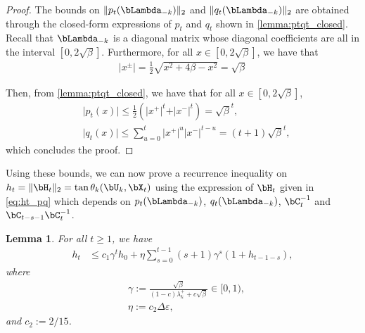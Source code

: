 \documentclass{article}
\theoremstyle{plain}
\newtheorem{lemma}[theorem]{Lemma}
\theoremstyle{definition}
\theoremstyle{remark}
\begin{document}
\begin{proof}
  The bounds on $\Vert p_t(\bLambda_{-k})\Vert_2$ and $\Vert q_t(\bLambda_{-k})\Vert_2$ are obtained through the closed-form expressions of $p_t$ and $q_t$ shown in \cref{lemma:ptqt_closed}. Recall that $\bLambda_{-k}$ is a diagonal matrix whose diagonal coefficients are all in the interval $[0, 2\sqrt{\beta}]$. Furthermore, for all $x\in [0,2\sqrt{\beta}]$, we have that
  \begin{align*}
    \vert x^\pm \vert = \frac{1}{2}\sqrt{x^2 + 4\beta - x^2} = \sqrt{\beta}
  \end{align*}
  
  Then, from \cref{lemma:ptqt_closed}, we have that for all $x \in [0,2\sqrt{\beta}]$,
  \begin{align*}
    & \vert p_t(x) \vert \leqslant \frac{1}{2}\left( \vert x^+\vert^t + \vert x^-\vert^t\right) = \sqrt{\beta}^t, \\
    & \vert q_t(x) \vert \leqslant \sum_{u=0}^t \vert x^+\vert^u \vert x^-\vert^{t-u} = (t+1)\sqrt{\beta}^t,
  \end{align*}
  which concludes the proof.
\end{proof}

Using these bounds, we can now prove a recurrence inequality on $h_t = \Vert \bH_t \Vert_2 = \tan \theta_k(\bU_k, \bX_t)$ using the expression of $\bH_t$ given in \eqref{eq:ht_pq} which depends on $p_t(\bLambda_{-k})$, $q_t(\bLambda_{-k})$, $\bC_t^{-1}$ and $\bC_{t-s-1}\bC_{t}^{-1}$.

\begin{lemma}\label{lemma:ht_bound}
  For all $t\geqslant 1$, we have
  \begin{align}\label{eq:ht_reccurence}
    h_t & \leqslant c_1\gamma^t h_0 + \eta \sum_{s=0}^{t-1} (s+1) \gamma^s (1 + h_{t-1-s}),
  \end{align}
  where
  \begin{align*}
    & \gamma := \frac{\sqrt{\beta}}{(1-c)\lambda_k^+ + c\sqrt{\beta}} \in [0,1),\\
    & \eta := c_2\Delta\varepsilon,
  \end{align*}
  and $c_2 := 2/15$.
\end{lemma}
\end{document}
